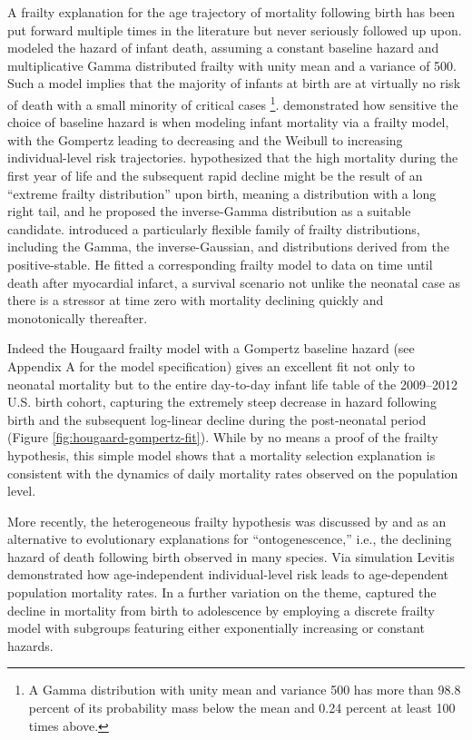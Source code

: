 \documentclass[10pt,twoside,reqno]{article}
\let\oldfootnote\footnote
\renewcommand\footnote[1]{%
\oldfootnote{\hspace{0.6mm}#1}}
\begin{document}
A frailty explanation for the age trajectory of mortality following birth has been put forward multiple times in the literature but never seriously followed up upon. \citet{Vaupel1983} modeled the hazard of infant death, assuming a constant baseline hazard and multiplicative Gamma distributed frailty with unity mean and a variance of 500. Such a model implies that the majority of infants at birth are at virtually no risk of death with a small minority of critical cases\footnote{A Gamma distribution with unity mean and variance 500 has more than 98.8 percent of its probability mass below the mean and 0.24 percent at least 100 times above.}. \citet{Trussell1985} demonstrated how sensitive the choice of baseline hazard is when modeling infant mortality via a frailty model, with the Gompertz leading to decreasing and the Weibull to increasing individual-level risk trajectories. \citet{Hougaard1984} hypothesized that the high mortality during the first year of life and the subsequent rapid decline might be the result of an ``extreme frailty distribution'' upon birth, meaning a distribution with a long right tail, and he proposed the inverse-Gamma distribution as a suitable candidate. \citet{Hougaard1986} introduced a particularly flexible family of frailty distributions, including the Gamma, the inverse-Gaussian, and distributions derived from the positive-stable. He fitted a corresponding frailty model to data on time until death after myocardial infarct, a survival scenario not unlike the neonatal case as there is a stressor at time zero with mortality declining quickly and monotonically thereafter.

Indeed the Hougaard frailty model with a Gompertz baseline hazard (see Appendix A for the model specification) gives an excellent fit not only to neonatal mortality but to the entire day-to-day infant life table of the 2009--2012 U.S. birth cohort, capturing the extremely steep decrease in hazard following birth and the subsequent log-linear decline during the post-neonatal period (Figure \ref{fig:hougaard-gompertz-fit}). While by no means a proof of the frailty hypothesis, this simple model shows that a mortality selection explanation is consistent with the dynamics of daily mortality rates observed on the population level.

More recently, the heterogeneous frailty hypothesis was discussed by \citet{Levitis2011} and \citet{Levitis2013} as an alternative to evolutionary explanations for ``ontogenescence,'' i.e., the declining hazard of death following birth observed in many species. Via simulation Levitis demonstrated how age-independent individual-level risk leads to age-dependent population mortality rates. In a further variation on the theme, \citet{Avraam2014} captured the decline in mortality from birth to adolescence by employing a discrete frailty model with subgroups featuring either exponentially increasing or constant hazards.
\end{document}
